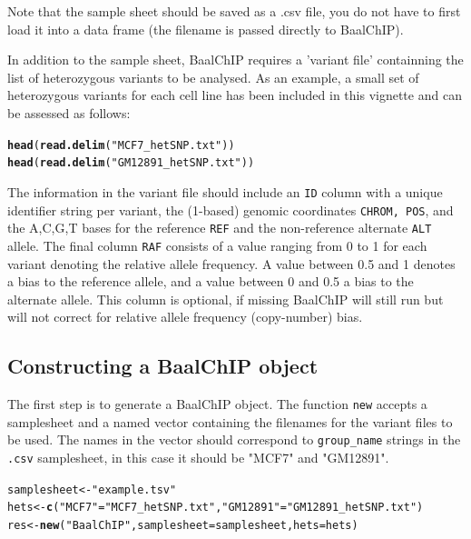 \documentclass{article}\usepackage[]{graphicx}\usepackage[usenames,dvipsnames]{color}
\makeatletter
\newcommand{\hlstr}[1]{\textcolor[rgb]{0.192,0.494,0.8}{#1}}%
\newcommand{\hlstd}[1]{\textcolor[rgb]{0.345,0.345,0.345}{#1}}%
\newcommand{\hlkwb}[1]{\textcolor[rgb]{0.69,0.353,0.396}{#1}}%
\newcommand{\hlkwc}[1]{\textcolor[rgb]{0.333,0.667,0.333}{#1}}%
\newcommand{\hlkwd}[1]{\textcolor[rgb]{0.737,0.353,0.396}{\textbf{#1}}}%
\newenvironment{kframe}{%
 \def\at@end@of@kframe{}%
 \ifinner\ifhmode%
  \def\at@end@of@kframe{\end{minipage}}%
  \begin{minipage}{\columnwidth}%
 \fi\fi%
 \def\FrameCommand##1{\hskip\@totalleftmargin \hskip-\fboxsep
 \colorbox{shadecolor}{##1}\hskip-\fboxsep
     \hskip-\linewidth \hskip-\@totalleftmargin \hskip\columnwidth}%
 \MakeFramed {\advance\hsize-\width
   \@totalleftmargin\z@ \linewidth\hsize
   \@setminipage}}%
 {\par\unskip\endMakeFramed%
 \at@end@of@kframe}
\newenvironment{knitrout}{}{} %
\makeatother
\begin{document}
Note that the sample sheet should be saved as a .csv file, you do not have to first load it into a data frame (the filename is passed directly to BaalChIP).

In addition to the sample sheet, BaalChIP requires a 'variant file' containning the list of heterozygous variants to be analysed. As an example, a small set of heterozygous variants for each cell line has been included in this vignette and can be assessed as follows:

\begin{knitrout}
\color{fgcolor}\begin{kframe}
\begin{alltt}
\hlkwd{head}\hlstd{(}\hlkwd{read.delim}\hlstd{(}\hlstr{"MCF7_hetSNP.txt"}\hlstd{))}
\hlkwd{head}\hlstd{(}\hlkwd{read.delim}\hlstd{(}\hlstr{"GM12891_hetSNP.txt"}\hlstd{))}
\end{alltt}
\end{kframe}
\end{knitrout}

The information in the variant file should include an \texttt{ID} column with a unique identifier string per variant, the (1-based) genomic coordinates \texttt{CHROM, POS}, and the A,C,G,T bases for the reference \texttt{REF} and the non-reference alternate \texttt{ALT} allele. The final column \texttt{RAF} consists of a 
value ranging from 0 to 1 for each variant denoting the relative allele frequency. A value between 0.5 and 1 denotes a bias to the reference allele, and a value between 0 and 0.5 a bias to the alternate allele. This column is optional, if missing BaalChIP will still run but will not correct for relative allele frequency (copy-number) bias.


\subsection{Constructing a BaalChIP object}

The first step is to generate a BaalChIP object. The function \texttt{new} accepts a samplesheet and a named vector containing the filenames for the variant files to be used. The names in the vector should correspond to \texttt{group_name} strings in the \texttt{.csv} samplesheet, in this case it should be "MCF7" and "GM12891".

\begin{knitrout}
\color{fgcolor}\begin{kframe}
\begin{alltt}
\hlstd{samplesheet} \hlkwb{<-} \hlstr{"example.tsv"}
\hlstd{hets} \hlkwb{<-} \hlkwd{c}\hlstd{(}\hlstr{"MCF7"}\hlstd{=}\hlstr{"MCF7_hetSNP.txt"}\hlstd{,} \hlstr{"GM12891"}\hlstd{=}\hlstr{"GM12891_hetSNP.txt"}\hlstd{)}
\hlstd{res} \hlkwb{<-} \hlkwd{new}\hlstd{(}\hlstr{"BaalChIP"}\hlstd{,} \hlkwc{samplesheet}\hlstd{=samplesheet,} \hlkwc{hets}\hlstd{=hets)}
\end{alltt}
\end{kframe}
\end{knitrout}
\end{document}
